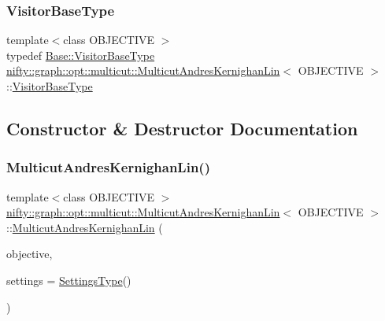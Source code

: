 \subsubsection{\texorpdfstring{Visitor\+Base\+Type}{VisitorBaseType}}
{\footnotesize\ttfamily template$<$class O\+B\+J\+E\+C\+T\+I\+VE $>$ \\
typedef \hyperlink{classnifty_1_1graph_1_1opt_1_1multicut_1_1MulticutAndres_a295da342b6ebe8a8720cadd1dcce2e57}{Base\+::\+Visitor\+Base\+Type} \hyperlink{classnifty_1_1graph_1_1opt_1_1multicut_1_1MulticutAndresKernighanLin}{nifty\+::graph\+::opt\+::multicut\+::\+Multicut\+Andres\+Kernighan\+Lin}$<$ O\+B\+J\+E\+C\+T\+I\+VE $>$\+::\hyperlink{classnifty_1_1graph_1_1opt_1_1multicut_1_1MulticutAndres_a295da342b6ebe8a8720cadd1dcce2e57}{Visitor\+Base\+Type}}



\subsection{Constructor \& Destructor Documentation}
\mbox{\label{classnifty_1_1graph_1_1opt_1_1multicut_1_1MulticutAndresKernighanLin_ae6f8a37ea05219cd63ae259f0dcede5b}} 
\subsubsection{\texorpdfstring{Multicut\+Andres\+Kernighan\+Lin()}{MulticutAndresKernighanLin()}}
{\footnotesize\ttfamily template$<$class O\+B\+J\+E\+C\+T\+I\+VE $>$ \\
\hyperlink{classnifty_1_1graph_1_1opt_1_1multicut_1_1MulticutAndresKernighanLin}{nifty\+::graph\+::opt\+::multicut\+::\+Multicut\+Andres\+Kernighan\+Lin}$<$ O\+B\+J\+E\+C\+T\+I\+VE $>$\+::\hyperlink{classnifty_1_1graph_1_1opt_1_1multicut_1_1MulticutAndresKernighanLin}{Multicut\+Andres\+Kernighan\+Lin} (\begin{DoxyParamCaption}\item[{const \hyperlink{classnifty_1_1graph_1_1opt_1_1multicut_1_1MulticutAndres_aed60c2f4ed9c6c6b97e8b513d7a48e86}{Objective\+Type} \&}]{objective,  }\item[{const \hyperlink{structnifty_1_1graph_1_1opt_1_1multicut_1_1MulticutAndresKernighanLin_1_1SettingsType}{Settings\+Type} \&}]{settings = {\ttfamily \hyperlink{structnifty_1_1graph_1_1opt_1_1multicut_1_1MulticutAndresKernighanLin_1_1SettingsType}{Settings\+Type}()} }\end{DoxyParamCaption})}



